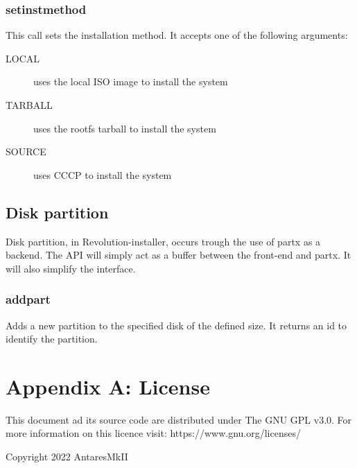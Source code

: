 \documentclass{scrartcl}
\begin{document}
\subsubsection{setinstmethod}
This call sets the installation method. It accepts one of the following
arguments:
\begin{description}
    \item[LOCAL] uses the local ISO image to install the system
    \item[TARBALL] uses the rootfs tarball to install the system
    \item[SOURCE] uses CCCP to install the system
\end{description}

\subsection{Disk partition}
Disk partition, in Revolution-installer, occurs trough the use of partx as a
backend. The API will simply act as a buffer between the front-end and partx.
It will also simplify the interface.
\subsubsection{addpart}
Adds a new partition to the specified disk of the defined size. It returns an id
to identify the partition.



\section*{Appendix A: License}
This document ad its source code are distributed under The GNU GPL v3.0. For
more information on this licence visit: https://www.gnu.org/licenses/

Copyright 2022 AntaresMkII
\end{document}
